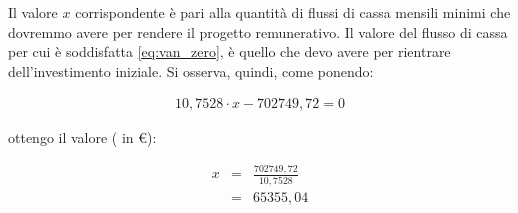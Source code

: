 Il valore $x$ corrispondente è pari alla quantità di flussi di cassa mensili minimi che dovremmo avere per rendere il progetto remunerativo. Il valore del flusso di cassa per cui è soddisfatta \ref{eq:van_zero}, è quello che devo avere per rientrare dell'investimento iniziale.
Si osserva, quindi, come ponendo:
			
	\begin{equation}
	\label{eq:van_pareggio_1}
	\begin{split}
 		10,7528 \cdot x - 702749,72 = 0	
 	\end{split}
	\end{equation}			

ottengo il valore ( in \euro ):
			
	\begin{eqnarray}
	\label{eq:van_pareggio_2}
		x & = & \frac{702749,72	}{10,7528}	 	\nonumber \\
		  & = & 65355,04
	\end{eqnarray}


